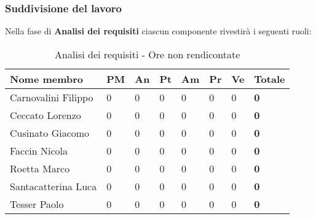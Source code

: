 		\subsubsection{Suddivisione del lavoro} %
		\label{ssub:suddivisione_del_lavoro}
		Nella fase di \textbf{Analisi dei requisiti} ciascun componente rivestirà i seguenti ruoli: \\
			\begin{table}[!h]
				\begin{center}
					\begin{tabularx}{0.9\textwidth}{|l|l|l|l|l|l|l|X|}
						\hline
						\textbf{Nome membro} & \textbf{PM} & \textbf{An} & \textbf{Pt} & \textbf{Am} & \textbf{Pr} & \textbf{Ve} & \textbf{Totale} \\
						\hline
						Carnovalini Filippo & 0 & 0 & 0 & 0 & 0 & 0 & \textbf{0} \\
						\hline
						Ceccato Lorenzo & 0 & 0 & 0 & 0 & 0 & 0 & \textbf{0} \\
						\hline
						Cusinato Giacomo & 0 & 0 & 0 & 0 & 0 & 0 & \textbf{0} \\
						\hline
						Faccin Nicola & 0 & 0 & 0 & 0 & 0 & 0 & \textbf{0} \\
						\hline
						Roetta Marco & 0 & 0 & 0 & 0 & 0 & 0 & \textbf{0} \\
						\hline
						Santacatterina Luca & 0 & 0 & 0 & 0 & 0 & 0 & \textbf{0} \\
						\hline
						Tesser Paolo & 0 & 0 & 0 & 0 & 0 & 0 & \textbf{0} \\
						\hline		
					\end{tabularx}
				\end{center}
			\caption{Analisi dei requisiti - Ore non rendicontate}
			\end{table}
		
